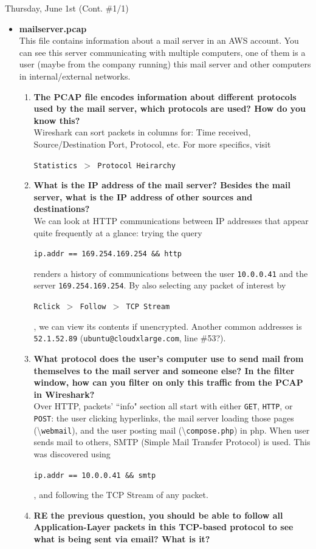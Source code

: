 \documentclass[11pt]{article}
\newcommand\codebox[1]{
    \noindent\hspace{-0.25em}\begin{tcolorbox}[on line, hbox, colback = codeblack, colframe = codeborder, coltext = white, boxrule = 1.5pt, left = 2pt, right = 2pt, top = 0.5pt, bottom = 0.5pt]
    \small\texttt{#1}\normalsize
    \end{tcolorbox}\hspace{-0.25em}
}
\begin{document}
\begin{bloodorangebox}{Thursday, June 1st (Cont. \#1/1)\vspace{-2em}\begin{flushright}\large {}\end{flushright}}
\begin{itemize}
    \item\LARGE\textbf{mailserver.pcap} \\
    \normalsize This file contains information about a mail server in an AWS account. You can see this server communicating with multiple computers, one of them is a user (maybe from the company running) this mail server and other computers in internal/external networks.
    \begin{enumerate}
    \item \textbf{The PCAP file encodes information about different protocols used by the mail server, which protocols are used? How do you know this?} \\

    \vspace{-1em}
    Wireshark can sort packets in columns for: Time received, Source/Destination Port, Protocol, etc. For more specifics, visit \codebox{Statistics $>$ Protocol Heirarchy}
    \item \textbf{What is the IP address of the mail server? Besides the mail server, what is the IP address of other sources and destinations?} \\

    \vspace{-1em}
    We can look at HTTP communications between IP addresses that appear quite frequently at a glance: trying the query \codebox{ip.addr == 169.254.169.254 \&\& http} renders a history of communications between the user \texttt{10.0.0.41} and the server \texttt{169.254.169.254}. By also selecting any packet of interest by \codebox{Rclick $>$ Follow $>$ TCP Stream}, we can view its contents if unencrypted. Another common addresses is \texttt{52.1.52.89} (\texttt{ubuntu@cloudxlarge.com}, line \#53?).
    \item \textbf{What protocol does the user's computer use to send mail from themselves to the mail server and someone else? In the filter window, how can you filter on only this traffic from the PCAP in Wireshark?} \\

    \vspace{-1em}
    Over HTTP, packets' ``info" section all start with either \texttt{GET}, \texttt{HTTP}, or \texttt{POST}: the user clicking hyperlinks, the mail server loading those pages (\textbackslash\texttt{webmail}), and the user posting mail (\textbackslash\texttt{compose.php}) in php. When user sends mail to others, SMTP (Simple Mail Transfer Protocol) is used. This was discovered using \codebox{ip.addr == 10.0.0.41 \&\& smtp}, and following the TCP Stream of any packet.
    \item \textbf{RE the previous question, you should be able to follow all Application-Layer packets in this TCP-based protocol to see what is being sent via email? What is it?} \\


\end{enumerate}
\end{itemize}
\end{bloodorangebox}
\end{document}
